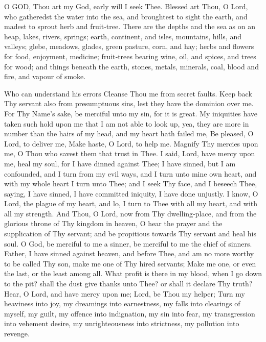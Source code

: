 

O GOD, Thou art my God, early will I seek Thee. Blessed art Thou, O Lord, who gatheredst the water into the sea, and broughtest to sight the earth, and madest to sprout herb and fruit‑tree. There are the depths and the sea as on an heap, lakes, rivers, springs; earth, continent, and isles, mountains, hills, and valleys; glebe, meadows, glades, green pasture, corn, and hay; herbs and flowers for food, enjoyment, medicine; fruit‑trees bearing wine, oil, and spices, and trees for wood; and things beneath the earth, stones, metals, minerals, coal, blood and fire, and vapour of smoke.


Who can understand his errors Cleanse Thou me from secret faults. Keep back Thy servant also from presumptuous sins, lest they have the dominion over me. For Thy Name’s sake, be merciful unto my sin, for it is great. My iniquities have taken such hold upon me that I am not able to look up, yea, they are more in number than the hairs of my head, and my heart hath failed me, Be pleased, O Lord, to deliver me, Make haste, O Lord, to help me. Magnify Thy mercies upon me, O Thou who savest them that trust in Thee. I said, Lord, have mercy upon me, heal my soul, for I have dinned against Thee; I have sinned, but I am confounded, and I turn from my evil ways, and I turn unto mine own heart, and with my whole heart I turn unto Thee; and I seek Thy face, and I beseech Thee, saying, I have sinned, I have committed iniquity, I have done unjustly. I know, O Lord, the plague of my heart, and lo, I turn to Thee with all my heart, and with all my strength. And Thou, O Lord, now from Thy dwelling‑place, and from the glorious throne of Thy kingdom in heaven, O hear the prayer and the supplication of Thy servant; and be propitious towards Thy servant and heal his soul. O God, be merciful to me a sinner, be merciful to me the chief of sinners. Father, I have sinned against heaven, and before Thee, and am no more worthy to be called Thy son, make me one of Thy hired servants; Make me one, or even the last, or the least among all. What profit is there in my blood,  when I go down to the pit? shall the dust give thanks unto Thee? or shall it declare Thy truth? Hear, O Lord, and have mercy upon me; Lord, be Thou my helper; Turn my heaviness into joy, my dreamings into earnestness, my falls into clearings of myself, my guilt, my offence into indignation, my sin into fear, my transgression into vehement desire, my unrighteousness into strictness, my pollution into revenge.

